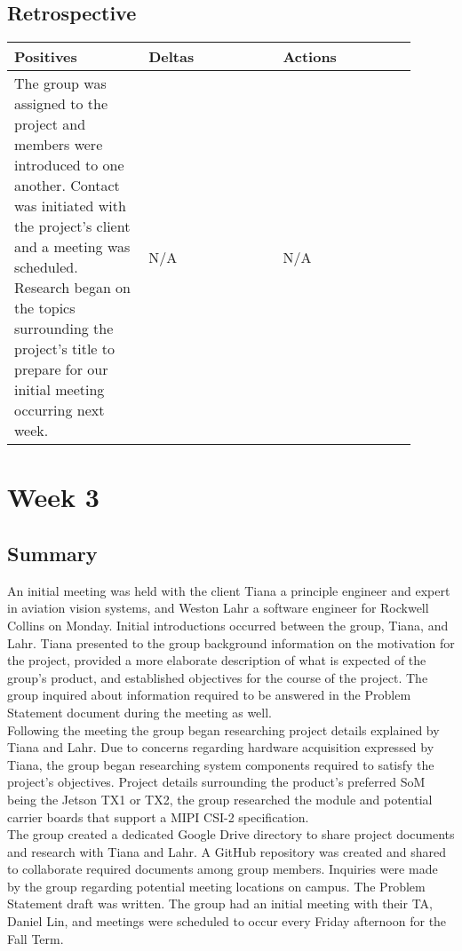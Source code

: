 \documentclass[letterpaper,10pt,serif,draftclsnofoot,onecolumn,compsoc,titlepage]{IEEEtran}
\begin{document}
\subsection{Retrospective}

\begin{tabular}{|p{0.3\linewidth}|p{0.3\linewidth}|p{0.3\linewidth}|}
   \hline
   \textbf{Positives} & \textbf{Deltas} & \textbf{Actions}\\ 
   \hline
   The group was assigned to the project and members were introduced to one another. 
   Contact was initiated with the project's client and a meeting was scheduled. 
   Research began on the topics surrounding the project's title to prepare 
   for our initial meeting occurring next week. 
   & 
   N/A 
   & 
   N/A \\
   \hline
\end{tabular}


\section{Week 3}

\subsection{Summary}

An initial meeting was held with the client Tiana a principle engineer and expert 
in aviation vision systems, and Weston Lahr a software engineer 
for Rockwell Collins on Monday. Initial introductions occurred between the group, 
Tiana, and Lahr. 
Tiana presented to the group background information on the motivation for the project, 
provided a more elaborate description of what is expected of the group's product, and 
established objectives for the course of the project. The group inquired about 
information required to be answered in the Problem Statement document during the meeting 
as well. \\

Following the meeting the group began researching project details explained by Tiana 
and Lahr. Due to concerns regarding hardware acquisition expressed by Tiana, the group 
began researching system components required to satisfy the project's objectives. 
Project details surrounding the product's preferred SoM being the Jetson TX1 or TX2, 
the group researched the module and potential carrier boards that support a MIPI 
CSI-2 specification. \\

The group created a dedicated Google Drive directory to share project documents and 
research with Tiana and Lahr. A GitHub repository was created and shared to 
collaborate required documents among group members. 
Inquiries were made by the group regarding potential meeting locations on campus.
The Problem Statement draft was 
written. The group had an initial meeting with their TA, Daniel Lin, and meetings 
were scheduled to occur every Friday afternoon for the Fall Term.\\
\end{document}
